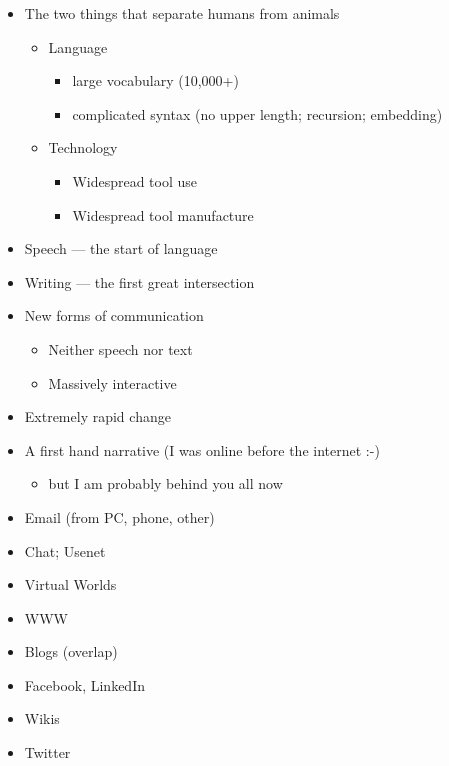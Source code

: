 \documentclass[a4paper,landscape,headrule,footrule,xetex]{foils}
\begin{document}

\begin{itemize}
\item The two things that separate humans from animals \citep[\S1.1]{Sproat:2010}
  \begin{itemize}
  \item Language
    \begin{itemize}
    \item large vocabulary (10,000+)
    \item complicated syntax (no upper length; recursion; embedding)
    \end{itemize}

  \item Technology
    \begin{itemize}
    \item Widespread tool use
    \item Widespread tool manufacture
    \end{itemize}
  \end{itemize}
\item Speech --- the start of language 
\item Writing --- the first great intersection
\end{itemize}


\begin{itemize}
\item New forms of communication
  \begin{itemize}
  \item Neither speech nor text
  \item Massively interactive
  \end{itemize}
\item Extremely rapid change
\item A first hand narrative (I was online before the internet :-)
  \begin{itemize}
  \item but I am probably behind you all now
  \end{itemize}
\end{itemize}


\MyLogo{}
\begin{itemize} 
\item Email (from PC, phone, other)
\item Chat; Usenet
\item Virtual Worlds
\item WWW
\item Blogs (overlap)
\item Facebook, LinkedIn
\item Wikis
\item Twitter
\end{itemize}
\end{document}
